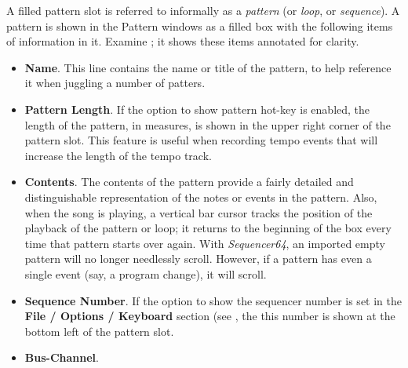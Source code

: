    A filled pattern slot is referred to informally as a \textsl{pattern}
   (or \textsl{loop}, or \textsl{sequence}).
   A pattern is shown in the Pattern windows as a filled box with the
   following items of information in it.
   Examine ; it shows
   these items annotated for clarity.

   \begin{itemize}
      \item \textbf{Name}.
         This line contains the name or title of the pattern, to help
         reference it when juggling a number of patters.
      \item \textbf{Pattern Length}.
         If the option to show pattern hot-key is enabled, the length of the
         pattern, in measures, is shown in the upper right corner of the
         pattern slot.  This feature is useful when recording tempo events that
         will increase the length of the tempo track.
      \item \textbf{Contents}.
         The contents of the pattern provide a fairly detailed and
         distinguishable representation of the notes or events in the
         pattern.  Also, when the song is playing, a vertical bar cursor
         tracks the position of the playback of the pattern or loop; it
         returns to the beginning of the box every time that pattern starts
         over again.
         With \textsl{Sequencer64}, an imported empty pattern will no longer
         needlessly scroll.
         However, if a pattern has even a single event (say, a program change),
         it will scroll.
      \item \textbf{Sequence Number}.
         If the option to show the sequencer number is set
         in the \textbf{File / Options / Keyboard} section
         (see ,
         the this number is shown at the bottom left of the pattern slot.
      \item \textbf{Bus-Channel}.

\end{itemize}
